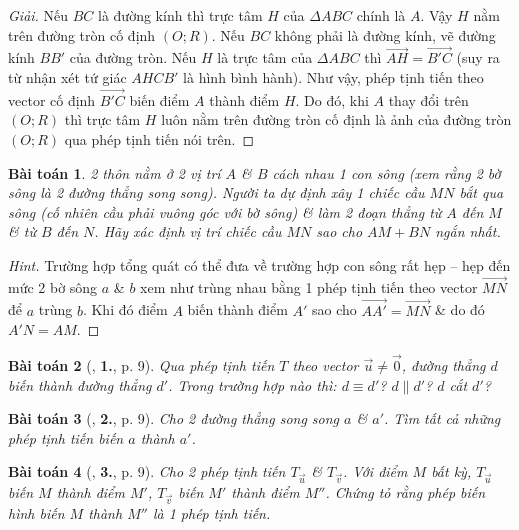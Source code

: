 \documentclass[oneside]{book}
\numberwithin{equation}{section}
\newtheorem{baitoan}{Bài toán}[section]
\begin{document}
\begin{proof}[Giải]
	Nếu $BC$ là đường kính thì trực tâm $H$ của $\Delta ABC$ chính là $A$. Vậy $H$ nằm trên đường tròn cố định $(O;R)$. Nếu $BC$ không phải là đường kính, vẽ đường kính $BB'$ của đường tròn. Nếu $H$ là trực tâm của $\Delta ABC$ thì $\overrightarrow{AH} = \overrightarrow{B'C}$ (suy ra từ nhận xét tứ giác $AHCB'$ là hình bình hành). Như vậy, phép tịnh tiến theo vector cố định $\overrightarrow{B'C}$ biến điểm $A$ thành điểm $H$. Do đó, khi $A$ thay đổi trên $(O;R)$ thì trực tâm $H$ luôn nằm trên đường tròn cố định là ảnh của đường tròn $(O;R)$ qua phép tịnh tiến nói trên.
\end{proof}

\begin{baitoan}
	2 thôn nằm ở 2 vị trí $A$ \& $B$ cách nhau 1 con sông (xem rằng 2 bờ sông là 2 đường thẳng song song). Người ta dự định xây 1 chiếc cầu $MN$ bắt qua sông (cố nhiên cầu phải vuông góc với bờ sông) \& làm 2 đoạn thẳng từ $A$ đến $M$ \& từ $B$ đến $N$. Hãy xác định vị trí chiếc cầu $MN$ sao cho $AM + BN$ ngắn nhất.
\end{baitoan}

\begin{proof}[Hint]
	Trường hợp tổng quát có thể đưa về trường hợp con sông rất hẹp -- hẹp đến mức 2 bờ sông $a$ \& $b$ xem như trùng nhau bằng 1 phép tịnh tiến theo vector $\overrightarrow{MN}$ để $a$ trùng $b$. Khi đó điểm $A$ biến thành điểm $A'$ sao cho $\overrightarrow{AA'} = \overrightarrow{MN}$ \& do đó $A'N = AM$.
\end{proof}

\begin{baitoan}[\cite{SGK_Toan_11_hinh_hoc_nang_cao}, \textbf{1.}, p. 9]
	Qua phép tịnh tiến $T$ theo vector $\vec{u}\ne\vec{0}$, đường thẳng $d$ biến thành đường thẳng $d'$. Trong trường hợp nào thì: $d\equiv d'$? $d\parallel d'$? $d$ cắt $d'$? 
\end{baitoan}

\begin{baitoan}[\cite{SGK_Toan_11_hinh_hoc_nang_cao}, \textbf{2.}, p. 9]
	Cho 2 đường thẳng song song $a$ \& $a'$. Tìm tất cả những phép tịnh tiến biến $a$ thành $a'$.
\end{baitoan}

\begin{baitoan}[\cite{SGK_Toan_11_hinh_hoc_nang_cao}, \textbf{3.}, p. 9]
	Cho 2 phép tịnh tiến $T_{\vec{u}}$ \& $T_{\vec{v}}$. Với điểm $M$ bất kỳ, $T_{\vec{u}}$ biến $M$ thành điểm $M'$, $T_{\vec{v}}$ biến $M'$ thành điểm $M''$. Chứng tỏ rằng phép biến hình biến $M$ thành $M''$ là 1 phép tịnh tiến.
\end{baitoan}
\end{document}
